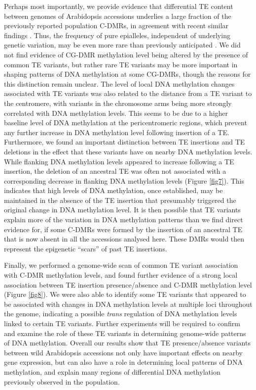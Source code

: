 \documentclass[12pt]{article}
\begin{document}
Perhaps most importantly, we provide evidence that differential TE
content between genomes of Arabidopsis accessions underlies a large
fraction of the previously reported population C-DMRs, in agreement with
recent similar findings \cite{Quadrana:2016bi}. Thus, the frequency of
pure epialleles, independent of underlying genetic variation, may be
even more rare than previously anticipated \cite{Richards:2006br}. We
did not find evidence of CG-DMR methylation level being altered by the
presence of common TE variants, but rather rare TE variants may be more
important in shaping patterns of DNA methylation at some CG-DMRs, though
the reasons for this distinction remain unclear. The level of local DNA
methylation changes associated with TE variants was also related to the
distance from a TE variant to the centromere, with variants in the
chromosome arms being more strongly correlated with DNA methylation
levels. This seems to be due to a higher baseline level of DNA
methylation at the pericentromeric regions, which prevent any further
increase in DNA methylation level following insertion of a TE.
Furthermore, we found an important distinction between TE insertions and
TE deletions in the effect that these variants have on nearby DNA
methylation levels. While flanking DNA methylation levels appeared to
increase following a TE insertion, the deletion of an ancestral TE was
often not associated with a corresponding decrease in flanking DNA
methylation levels (Figure \ref{fig7}). This indicates that high levels of DNA
methylation, once established, may be maintained in the absence of the
TE insertion that presumably triggered the original change in DNA
methylation level. It is then possible that TE variants explain more of
the variation in DNA methylation patterns than we find direct evidence
for, if some C-DMRs were formed by the insertion of an ancestral TE that
is now absent in all the accessions analysed here. These DMRs would then
represent the epigenetic ``scars'' of past TE insertions.

Finally, we performed a genome-wide scan of common TE variant
association with C-DMR methylation levels, and found further evidence of
a strong local association between TE insertion presence/absence and
C-DMR methylation level (Figure \ref{fig8}). We were also able to identify some
TE variants that appeared to be associated with changes in DNA
methylation levels at multiple loci throughout the genome, indicating a
possible \emph{trans} regulation of DNA methylation levels linked to
certain TE variants. Further experiments will be required to confirm and
examine the role of these TE variants in determining genome-wide
patterns of DNA methylation. Overall our results show that TE
presence/absence variants between wild Arabidopsis accessions not only
have important effects on nearby gene expression, but can also have a
role in determining local patterns of DNA methylation, and explain many
regions of differential DNA methylation previously observed in the
population.
\end{document}
